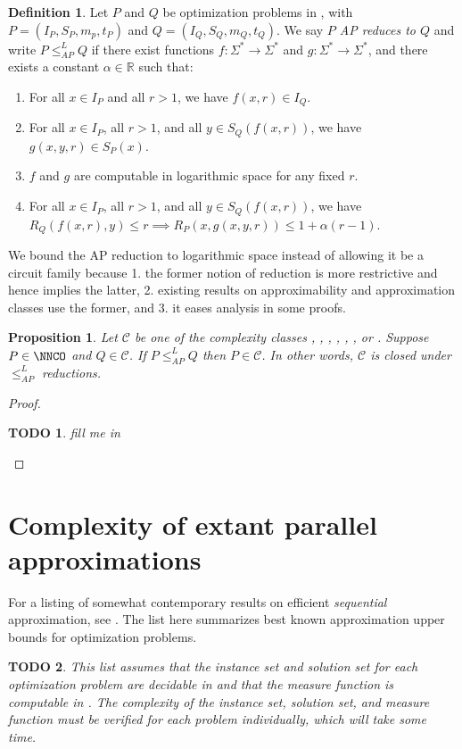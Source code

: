 \documentclass[]{article}
\theoremstyle{plain}
\newtheorem{proposition}{Proposition}
\newtheorem{todo}{TODO}
\theoremstyle{definition}
\newtheorem{definition}{Definition}
\newcommand{\APr}{\leq_{AP}^{L}}
\begin{document}
\begin{definition}{\cite[Definition~9]{ckst95}}
  Let $P$ and $Q$ be optimization problems in \NNCO, with $P=(I_P, S_P, m_p, t_P)$ and $Q=(I_Q, S_Q, m_Q, t_Q)$.
  We say \emph{$P$ AP reduces to $Q$} and write $P\APr Q$ if there exist functions $f\colon\Sigma^*\to\Sigma^*$ and $g\colon\Sigma^*\to\Sigma^*$, and there exists a constant $\alpha\in\mathbb{R}$ such that:
  \begin{enumerate}
  \item For all $x\in I_P$ and all $r > 1$, we have $f(x, r)\in I_Q$.
  \item For all $x\in I_P$, all $r > 1$, and all $y\in S_Q(f(x, r))$, we have $g(x, y, r)\in S_P(x)$.
  \item $f$ and $g$ are computable in logarithmic space for any fixed $r$.
  \item For all $x\in I_P$, all $r > 1$, and all $y\in S_Q(f(x, r))$, we have $R_Q(f(x, r), y) \leq r \implies R_P(x, g(x, y, r)) \leq 1 + \alpha(r - 1)$.
  \end{enumerate}
\end{definition}

We bound the AP reduction to logarithmic space instead of allowing it be a \FNC{} circuit family because 1. the former notion of reduction is more restrictive and hence implies the latter, 2. existing results on approximability and approximation classes use the former, and 3. it eases analysis in some proofs.

\begin{proposition}
  Let $\mathcal{C}$ be one of the complexity classes \NCO, \NCAS, \ApxNCO, \logApxNCO, \polyApxNCO, \expApxNCO, or \NNCO.
  Suppose $P\in\NNCO$ and $Q\in\mathcal{C}$.
  If $P\APr Q$ then $P\in \mathcal{C}$.
  In other words, $\mathcal{C}$ is closed under $\APr$ reductions.
\end{proposition}
\begin{proof}
  \begin{todo}
    fill me in
  \end{todo}
\end{proof}

\section{Complexity of extant parallel approximations}

For a listing of somewhat contemporary results on efficient \emph{sequential} approximation, see \cite{compendium}.
The list here summarizes best known approximation upper bounds for optimization problems.
\begin{todo}
  This list \emph{assumes} that the instance set and solution set for each optimization problem are decidable in \NC{} and that the measure function is computable in \FNC{}.
  The complexity of the instance set, solution set, and measure function must be verified for each problem individually, which will take some time.
\end{todo}
\end{document}
